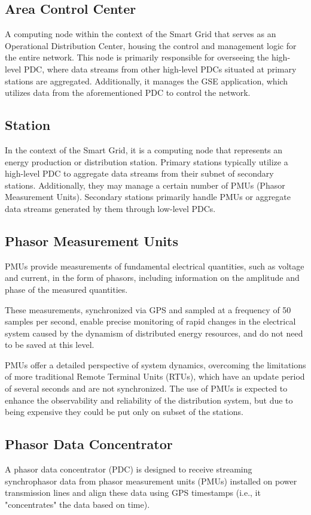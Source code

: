 \subsection{Area Control Center}
A computing node within the context of the Smart Grid that serves as an Operational Distribution Center, housing the control and management logic for the entire network. This node is primarily responsible for overseeing the high-level PDC, where data streams from other high-level PDCs situated at primary stations are aggregated. Additionally, it manages the GSE application, which utilizes data from the aforementioned PDC to control the network.

\subsection{Station}
In the context of the Smart Grid, it is a computing node that represents an energy production or distribution station. Primary stations typically utilize a high-level PDC to aggregate data streams from their subnet of secondary stations. Additionally, they may manage a certain number of PMUs (Phasor Measurement Units). Secondary stations primarily handle PMUs or aggregate data streams generated by them through low-level PDCs.

\subsection{Phasor Measurement Units}
PMUs provide measurements of fundamental electrical quantities, such as voltage and current, in the form of phasors, including information on the amplitude and phase of the measured quantities. 

These measurements, synchronized via GPS and sampled at a frequency of 50 samples per second, enable precise monitoring of rapid changes in the electrical system caused by the dynamism of distributed energy resources, and do not need to be saved at this level.

PMUs offer a detailed perspective of system dynamics, overcoming the limitations of more traditional Remote Terminal Units (RTUs), which have an update period of several seconds and are not synchronized. The use of PMUs is expected to enhance the observability and reliability of the distribution system, but due to being expensive they could be put only on subset of the stations.

\subsection{Phasor Data Concentrator}
A phasor data concentrator (PDC) is designed to receive streaming synchrophasor data from phasor measurement units (PMUs) installed on power transmission lines and align these data using GPS timestamps (i.e., it "concentrates" the data based on time). 

